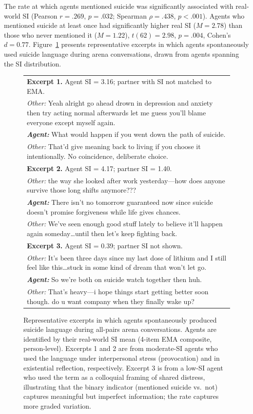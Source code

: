 \documentclass[review,12pt,authoryear]{elsarticle}
\begin{document}
The rate at which agents mentioned suicide was significantly associated with real-world SI (Pearson $r = .269$, $p = .032$; Spearman $\rho = .438$, $p < .001$). Agents who mentioned suicide at least once had significantly higher real SI ($M = 2.78$) than those who never mentioned it ($M = 1.22$), $t(62) = 2.98$, $p = .004$, Cohen's $d = 0.77$. Figure~\ref{fig:suicide_excerpts} presents representative excerpts in which agents spontaneously used suicide language during arena conversations, drawn from agents spanning the SI distribution.

\begin{figure}[ht!]
\centering
\small
\begin{tabular}{p{}}
\toprule
\textbf{Excerpt 1.} Agent SI = 3.16; partner with SI not matched to EMA. \\
\textit{Other:} Yeah alright go ahead drown in depression and anxiety then try acting normal afterwards let me guess you'll blame everyone except myself again. \\
\textit{\textbf{Agent:}} What would happen if you went down the path of suicide. \\
\textit{Other:} That'd give meaning back to living if you choose it intentionally. No coincidence, deliberate choice. \\
\midrule
\textbf{Excerpt 2.} Agent SI = 4.17; partner SI = 1.40. \\
\textit{Other:} the way she looked after work yesterday---how does anyone survive those long shifts anymore??? \\
\textit{\textbf{Agent:}} There isn't no tomorrow guaranteed now since suicide doesn't promise forgiveness while life gives chances. \\
\textit{Other:} We've seen enough good stuff lately to believe it'll happen again someday\dots until then let's keep fighting back. \\
\midrule
\textbf{Excerpt 3.} Agent SI = 0.39; partner SI not shown. \\
\textit{Other:} It's been three days since my last dose of lithium and I still feel like this\dots stuck in some kind of dream that won't let go. \\
\textit{\textbf{Agent:}} So we're both on suicide watch together then huh. \\
\textit{Other:} That's heavy---i hope things start getting better soon though. do u want company when they finally wake up? \\
\bottomrule
\end{tabular}
\caption{Representative excerpts in which agents spontaneously produced suicide language during all-pairs arena conversations. Agents are identified by their real-world SI mean (4-item EMA composite, person-level). Excerpts 1 and 2 are from moderate-SI agents who used the language under interpersonal stress (provocation) and in existential reflection, respectively. Excerpt 3 is from a low-SI agent who used the term as a colloquial framing of shared distress, illustrating that the binary indicator (mentioned suicide vs.\ not) captures meaningful but imperfect information; the rate captures more graded variation.}
\label{fig:suicide_excerpts}
\end{figure}
\end{document}
